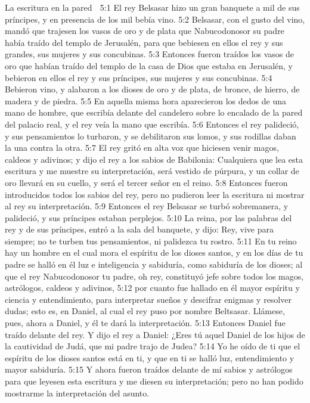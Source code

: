 La escritura en la pared  

5:1 El rey Belsasar hizo un gran banquete a mil de sus príncipes, y en presencia de los mil bebía vino.  
5:2 Belsasar, con el gusto del vino, mandó que trajesen los vasos de oro y de plata que Nabucodonosor su padre había traído del templo de Jerusalén, para que bebiesen en ellos el rey y sus grandes, sus mujeres y sus concubinas.  
5:3 Entonces fueron traídos los vasos de oro que habían traído del templo de la casa de Dios que estaba en Jerusalén, y bebieron en ellos el rey y sus príncipes, sus mujeres y sus concubinas.  
5:4 Bebieron vino, y alabaron a los dioses de oro y de plata, de bronce, de hierro, de madera y de piedra.  
5:5 En aquella misma hora aparecieron los dedos de una mano de hombre, que escribía delante del candelero sobre lo encalado de la pared del palacio real, y el rey veía la mano que escribía.  
5:6 Entonces el rey palideció, y sus pensamientos lo turbaron, y se debilitaron sus lomos, y sus rodillas daban la una contra la otra.  
5:7 El rey gritó en alta voz que hiciesen venir magos, caldeos y adivinos; y dijo el rey a los sabios de Babilonia: Cualquiera que lea esta escritura y me muestre su interpretación, será vestido de púrpura, y un collar de oro llevará en su cuello, y será el tercer señor en el reino.  
5:8 Entonces fueron introducidos todos los sabios del rey, pero no pudieron leer la escritura ni mostrar al rey su interpretación. 
5:9 Entonces el rey Belsasar se turbó sobremanera, y palideció, y sus príncipes estaban perplejos.  
5:10 La reina, por las palabras del rey y de sus príncipes, entró a la sala del banquete, y dijo: Rey, vive para siempre; no te turben tus pensamientos, ni palidezca tu rostro. 
5:11 En tu reino hay un hombre en el cual mora el espíritu de los dioses santos, y en los días de tu padre se halló en él luz e inteligencia y sabiduría, como sabiduría de los dioses; al que el rey Nabucodonosor tu padre, oh rey, constituyó jefe sobre todos los magos, astrólogos, caldeos y adivinos,  
5:12 por cuanto fue hallado en él mayor espíritu y ciencia y entendimiento, para interpretar sueños y descifrar enigmas y resolver dudas; esto es, en Daniel, al cual el rey puso por nombre Beltsasar. Llámese, pues, ahora a Daniel, y él te dará la interpretación.  
5:13 Entonces Daniel fue traído delante del rey. Y dijo el rey a Daniel: ¿Eres tú aquel Daniel de los hijos de la cautividad de Judá, que mi padre trajo de Judea?  
5:14 Yo he oído de ti que el espíritu de los dioses santos está en ti, y que en ti se halló luz, entendimiento y mayor sabiduría.  
5:15 Y ahora fueron traídos delante de mí sabios y astrólogos para que leyesen esta escritura y me diesen su interpretación; pero no han podido mostrarme la interpretación del asunto.  
